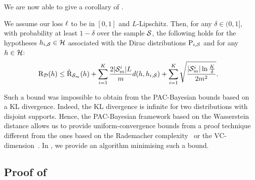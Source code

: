\begin{noaddcontents}
    We are now able to give a corollary of .
    
    \begin{corollary}\label{corollary:supervised-nnl} We assume our loss $\loss$ to be in $[0,1]$ and $L$-Lipschitz. 
    Then, for any $\delta\in(0,1]$, with probability at least $1-\delta$ over the sample $\S$, the following holds for the hypotheses $h_{i,\S}\in\H$ associated with the Dirac distributions $\P_{i,\S}$ and for any $h\in\H$: 
    \begin{align*}
    \Risk_{\D}(h) \le \Riskhat_{\Sm}(h) + \sum_{i=1}^{K} \frac{2|\Sm^{i}|L}{m} d(h, h_{i,\S}) + \sum_{i=1}^{K} \sqrt{\frac{|\Sm^{i}|\ln\frac{K}{\delta}}{2m^2}}.
    \end{align*}
    \end{corollary}
    
    Such a bound was impossible to obtain from the PAC-Bayesian bounds based on a KL divergence.
    Indeed, the KL divergence is infinite for two distributions with disjoint supports. 
    Hence, the PAC-Bayesian framework based on the Wasserstein distance allows us to provide uniform-convergence bounds from a proof technique different from the ones based on the Rademacher complexity~\cite{koltchinskii2000rademacher,bartlett2001rademacher,bartlett2002rademacher} or the VC-dimension~\cite{vapnik1968uniform,vapnik1974theory}.
    In , we provide an algorithm minimising such a bound.
    
    \subsection{Proof of }
    \label{sec:proof-online-ht}
    

\end{noaddcontents}

